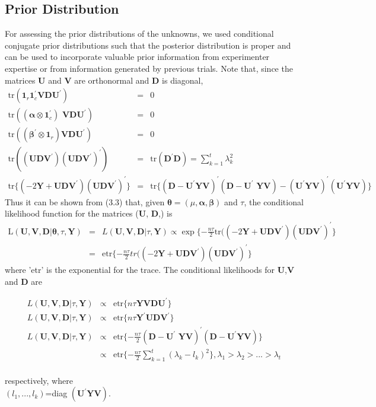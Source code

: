 \subsection{Prior Distribution}
For assessing the prior distributions of the unknowns, we used conditional conjugate prior distributions such that the posterior distribution is proper and can be used to incorporate valuable prior information from experimenter expertise or from information generated by previous trials. Note that, since the matrices \textbf{U} and \textbf{V} are orthonormal and \textbf{D} is diagonal,\\
\begin{eqnarray}
\text{tr}(\textbf{1}_r\textbf{1}_c^\prime \textbf{VDU}^\prime)&=& 0 \nonumber\\
\text{tr}((\bm{\alpha} \otimes\textbf{1}_c^\prime)\textbf{ VDU}^\prime)&=& 0 \nonumber \\
\text{tr}((\bm{\beta}^\prime \otimes \textbf{1}_r) \textbf{VDU}^\prime)&=& 0 \\
\text{tr}((\textbf{UDV}^\prime)(\textbf{UDV}^\prime)^\prime)&=& \text{tr}(\textbf{D}^\prime \textbf{D})=\sum_{k=1}^t \lambda_k^2 \nonumber \\
\text{tr}\{(-2\textbf{Y} + \textbf{UDV}^\prime)(\textbf{UDV}^\prime)^\prime\}&=& \text{tr}\{(\textbf{D}-\textbf{U}^\prime \textbf{YV})^\prime (\textbf{D}-\textbf{U}^\prime\textbf{ YV})-(\textbf{U}^\prime \textbf{YV})^\prime(\textbf{U}^\prime \textbf{YV})\} \nonumber
\end{eqnarray}
Thus it can be shown from (3.3) that, given $\bm{\theta}=(\mu,\bm{\alpha},\bm{\beta})$ and $\tau$, the conditional likelihood function for the matrices (\textbf{U}, \textbf{D},) is
\begin{eqnarray}
\text{L}(\textbf{U},\textbf{V},\textbf{D}|\bm{\theta},\tau,\textbf{Y})&=& L(\textbf{U},\textbf{V},\textbf{D}|\tau,\textbf{Y}) \varpropto \exp \{-\frac{n\tau}{2}\text{tr}((-2\textbf{Y}+\textbf{UDV}^\prime)(\textbf{UDV}^\prime)^\prime\} 
\nonumber\\
&=& \text{etr}\{-\frac{n\tau}{2}tr((-2\textbf{Y}+\textbf{UDV}^\prime)(\textbf{UDV}^\prime)^\prime\} \end{eqnarray}
where 'etr' is the exponential for the trace. The conditional likelihoods for \textbf{U},\textbf{V} and \textbf{D} are

\begin{eqnarray}L(\textbf{U},\textbf{V},\textbf{D}|\tau,\textbf{Y}) &\varpropto& \text{etr} \{n\tau \textbf{YVDU}^\prime\} \\
 L(\textbf{U},\textbf{V},\textbf{D}|\tau,\textbf{Y}) &\varpropto& \text{etr} \{n\tau \textbf{Y}^\prime \textbf{UDV}^\prime\} \\
L(\textbf{U},\textbf{V},\textbf{D}|\tau,\textbf{Y}) &\varpropto& \text{etr} \{-\frac{n\tau}{2}(\textbf{D}-\textbf{U}^\prime\textbf{ YV})^\prime(\textbf{D}-\textbf{U}^\prime \textbf{YV}) \} \nonumber \\
&\varpropto& \text{etr} \{-\frac{n\tau}{2}\sum_{k=1}^t(\lambda_k-l_k)^2 \}, \lambda_1 >\lambda_2> . . .>\lambda_t \end{eqnarray} \\
respectively, where \\
$(l_1,...,l_k)$=diag $(\textbf{U}^\prime \textbf{YV})$.

